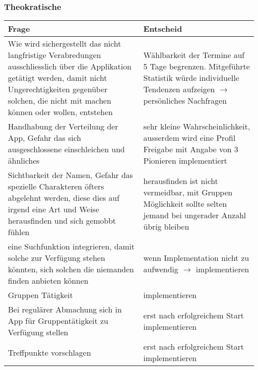 \subsubsection{Theokratische}

\begin{tabularx}{\textwidth}{X|X}
Frage & Entscheid \\\hline
Wie wird sichergestellt das nicht langfristige Verabredungen ausschliesslich über die Applikation getätigt werden, damit nicht Ungerechtigkeiten gegenüber solchen, die nicht mit machen können oder wollen, entstehen & Wählbarkeit der Termine auf 5 Tage begrenzen. Mitgeführte Statistik würde individuelle Tendenzen aufzeigen $\rightarrow$ persönliches Nachfragen \\\hline
Handhabung der Verteilung der App, Gefahr das sich ausgeschlossene einschleichen und ähnliches & sehr kleine Wahrscheinlichkeit, ausserdem wird eine Profil Freigabe mit Angabe von 3 Pionieren implementiert\\\hline
Sichtbarkeit der Namen, Gefahr das spezielle Charakteren öfters abgelehnt werden, diese dies auf irgend eine Art und Weise herausfinden und sich gemobbt fühlen & herausfinden ist nicht vermeidbar, mit Gruppen Möglichkeit sollte selten jemand bei ungerader Anzahl übrig bleiben\\\hline
eine Suchfunktion integrieren, damit solche zur Verfügung stehen könnten, sich solchen die niemanden finden anbieten können & wenn Implementation nicht zu aufwendig $\rightarrow$ implementieren\\\hline
Gruppen Tätigkeit & implementieren \\\hline
Bei regulärer Abmachung sich in App für Gruppentätigkeit zu Verfügung stellen & erst nach erfolgreichem Start implementieren\\\hline
Treffpunkte vorschlagen & erst nach erfolgreichem Start implementieren\\
\end{tabularx}